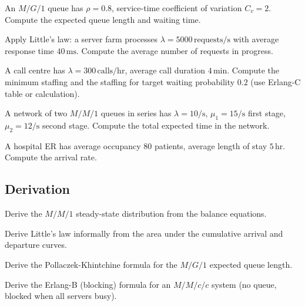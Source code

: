 \begin{exercise}
An $M/G/1$ queue has $\rho = 0.8$, service-time coefficient of variation $C_v = 2$. Compute the expected queue length and waiting time.
\end{exercise}

\begin{exercise}
Apply Little's law: a server farm processes $\lambda = 5000\,\text{requests/s}$ with average response time $40\,\text{ms}$. Compute the average number of requests in progress.
\end{exercise}

\begin{exercise}
A call centre has $\lambda = 300\,\text{calls/hr}$, average call duration $4\,\text{min}$. Compute the minimum staffing and the staffing for target waiting probability $0.2$ (use Erlang-C table or calculation).
\end{exercise}

\begin{exercise}
A network of two $M/M/1$ queues in series has $\lambda = 10/\text{s}$, $\mu_1 = 15/\text{s}$ first stage, $\mu_2 = 12/\text{s}$ second stage. Compute the total expected time in the network.
\end{exercise}

\begin{exercise}
A hospital ER has average occupancy $80$ patients, average length of stay $5\,\text{hr}$. Compute the arrival rate.
\end{exercise}

\subsection*{Derivation}

\begin{exercise}
Derive the $M/M/1$ steady-state distribution from the balance equations.
\end{exercise}

\begin{exercise}
Derive Little's law informally from the area under the cumulative arrival and departure curves.
\end{exercise}

\begin{exercise}
Derive the Pollaczek-Khintchine formula for the $M/G/1$ expected queue length.
\end{exercise}

\begin{exercise}
Derive the Erlang-B (blocking) formula for an $M/M/c/c$ system (no queue, blocked when all servers busy).
\end{exercise}

